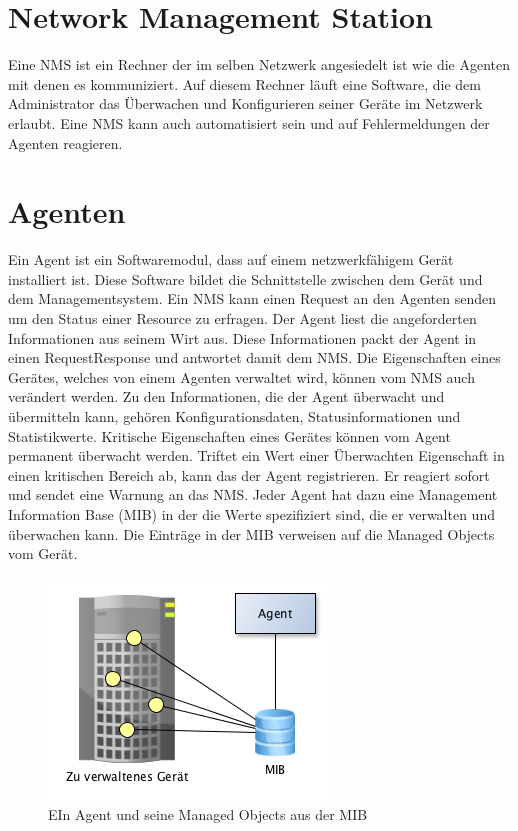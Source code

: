 \documentclass[11pt,a4paper]{article}
\begin{document}
\section{Network Management Station}
Eine NMS ist ein Rechner der im selben Netzwerk angesiedelt ist wie die Agenten mit denen es kommuniziert. Auf diesem Rechner läuft eine Software, die dem Administrator das Überwachen und Konfigurieren seiner Geräte im Netzwerk erlaubt. Eine NMS kann auch automatisiert sein und auf Fehlermeldungen der Agenten reagieren.
\\

\section{Agenten}
Ein Agent ist ein Softwaremodul, dass auf einem netzwerkfähigem Gerät installiert ist. Diese Software bildet die Schnittstelle zwischen dem Gerät und dem Managementsystem. Ein NMS kann einen Request an den Agenten senden um den Status einer Resource zu erfragen. Der Agent liest die angeforderten Informationen aus seinem Wirt aus. Diese Informationen packt der Agent in einen RequestResponse und antwortet damit dem NMS. Die Eigenschaften eines Gerätes, welches von einem Agenten verwaltet wird, können vom NMS auch verändert werden. Zu den Informationen, die der Agent überwacht und übermitteln kann, gehören Konfigurationsdaten, Statusinformationen und Statistikwerte.
Kritische Eigenschaften eines Gerätes können vom Agent permanent überwacht werden. Triftet ein Wert einer Überwachten Eigenschaft in einen kritischen Bereich ab, kann das der Agent registrieren. Er reagiert sofort und sendet eine Warnung an das NMS.
Jeder Agent hat dazu eine Management Information Base (MIB) in der die Werte spezifiziert sind, die er verwalten und überwachen kann. Die Einträge in der MIB verweisen auf die Managed Objects vom Gerät.
\\
\begin{figure}[h]
	\centering
	\includegraphics[scale=.7]{Bilder/Agent.png}
	\caption{EIn Agent und seine Managed Objects aus der MIB}
\end{figure}
\end{document}
